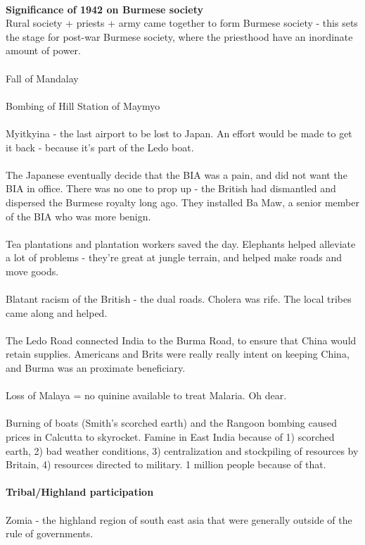 \documentclass[a4paper]{article}
\begin{document}
\\
\textbf{Significance of 1942 on Burmese society}\\
Rural society + priests + army came together to form Burmese society - this sets the stage for post-war Burmese society, where the priesthood have an inordinate amount of power.\\
\\
Fall of Mandalay\\
\\
Bombing of Hill Station of Maymyo\\
\\
Myitkyina - the last airport to be lost to Japan. An effort would be made to get it back - because it's part of the Ledo boat.\\
\\
The Japanese eventually decide that the BIA was a pain, and did not want the BIA in office. There was no one to prop up - the British had dismantled and dispersed the Burmese royalty long ago. They installed Ba Maw, a senior member of the BIA who was more benign.\\
\\
Tea plantations and plantation workers saved the day. Elephants helped alleviate a lot of problems - they're great at jungle terrain, and helped make roads and move goods.\\
\\
Blatant racism of the British - the dual roads. Cholera was rife. The local tribes came along and helped.\\
\\
The Ledo Road connected India to the Burma Road, to ensure that China would retain supplies. Americans and Brits were really really intent on keeping China, and Burma was an proximate beneficiary.\\
\\
Loss of Malaya = no quinine available to treat Malaria. Oh dear.\\
\\
Burning of boats (Smith's scorched earth) and the Rangoon bombing caused prices in Calcutta to skyrocket. Famine in East India because of 1) scorched earth, 2) bad weather conditions, 3) centralization and stockpiling of resources by Britain, 4) resources directed to military. 1 million people because of that.\\
\\
\textbf{Tribal/Highland participation}\\
\\
Zomia - the highland region of south east asia that were generally outside of the rule of governments. \\
\end{document}
